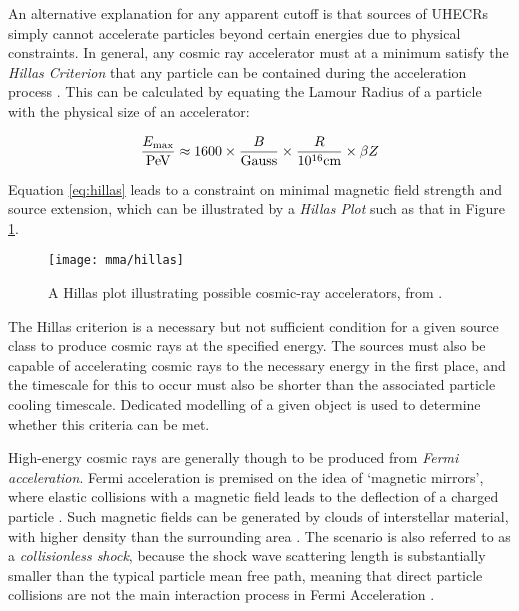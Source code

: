 An alternative explanation for any apparent cutoff is that sources of UHECRs simply cannot accelerate particles beyond certain energies due to physical constraints. In general, any cosmic ray accelerator must at a minimum satisfy the \emph{Hillas Criterion} that any particle can be contained during the acceleration process . This can be calculated by equating the Lamour Radius of a particle with the physical size of an accelerator:

\begin{equation}
	\frac{E_{\textup{max}}}{\textup{PeV}} \approx
	1600 \times \frac{B}{\textup{Gauss}} \times \frac{R}{10^{16} \textup{cm}} \times
	\beta Z
	\label{eq:hillas}
\end{equation}

Equation \ref{eq:hillas} leads to a constraint on minimal magnetic field strength and source extension, which can be illustrated by a \emph{Hillas Plot} such as that in Figure \ref{fig:hillas_plot}. 

\begin{figure}[!ht]
	\centering \texttt{[image: mma/hillas]}
	\caption{A Hillas plot illustrating possible cosmic-ray accelerators, from \cite{hillas_plot_19}.}
	\label{fig:hillas_plot}
\end{figure}

The Hillas criterion is a necessary but not sufficient condition for a given source class to produce cosmic rays at the specified energy. The sources must also be capable of accelerating cosmic rays to the necessary energy in the first place, and the timescale for this to occur must also be shorter than the associated particle cooling timescale. Dedicated modelling of a given object is used to determine whether this criteria can be met.

High-energy cosmic rays are generally though to be produced from \emph{Fermi acceleration}. Fermi acceleration is premised on the idea of `magnetic mirrors', where elastic collisions with a magnetic field leads to the deflection of a charged particle . Such magnetic fields can be generated by clouds of interstellar material, with higher density than the surrounding area \cite{spurio_18}. The scenario is also referred to as a \emph{collisionless shock}, because the shock wave scattering length is substantially smaller than the typical particle mean free path, meaning that direct particle collisions are not the main interaction process in Fermi Acceleration \cite{spurio_18}. 

